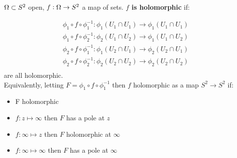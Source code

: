 \begin{definition}

$\Omega \subset S^2$ open, $f:\Omega \to S^2$ a map of sets. \textbf{$f$ is holomorphic} if:

\begin{align*}
    \phi_1 \circ f \circ \phi_1^{-1} : \phi_1 \left( U_1 \cap U_1 \right) \to \phi_1 \left( U_1 \cap U_1\right)\\
    \phi_1 \circ f \circ \phi_2^{-1} : \phi_2 \left( U_1 \cap U_2 \right) \to \phi_1 \left( U_1 \cap U_2\right)\\
    \phi_2 \circ f \circ \phi_1^{-1} : \phi_1 \left( U_2 \cap U_1 \right) \to \phi_2 \left( U_2 \cap U_1\right)\\
    \phi_2 \circ f \circ \phi_2^{-1} : \phi_2 \left( U_2 \cap U_2 \right) \to \phi_2 \left( U_2 \cap U_2\right)\\
\end{align*}
are all holomorphic.\\

Equivalently, letting $F= \phi_1 \circ f \circ \phi_1^{-1}$ then $f$ holomorphic as a map $S^2 \to S^2$ if:

\begin{itemize}
    \item F holomorphic
    \item $f:z \mapsto \infty$ then $F$ has a pole at $z$
    \item $f:\infty \mapsto z$ then $F$ holomorphic at $\infty$
    \item $f: \infty \mapsto \infty$ then $F$ has a pole at $\infty$
\end{itemize}
\end{definition}










